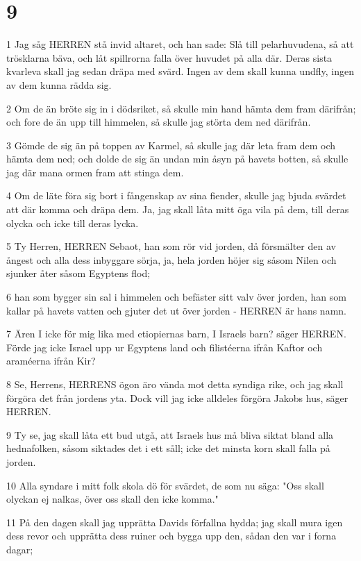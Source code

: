\chapter{9}

\par 1 Jag såg HERREN stå invid altaret, och han sade: Slå till pelarhuvudena, så att trösklarna bäva, och låt spillrorna falla över huvudet på alla där. Deras sista kvarleva skall jag sedan dräpa med svärd. Ingen av dem skall kunna undfly, ingen av dem kunna rädda sig.
\par 2 Om de än bröte sig in i dödsriket, så skulle min hand hämta dem fram därifrån; och fore de än upp till himmelen, så skulle jag störta dem ned därifrån.
\par 3 Gömde de sig än på toppen av Karmel, så skulle jag där leta fram dem och hämta dem ned; och dolde de sig än undan min åsyn på havets botten, så skulle jag där mana ormen fram att stinga dem.
\par 4 Om de läte föra sig bort i fångenskap av sina fiender, skulle jag bjuda svärdet att där komma och dräpa dem. Ja, jag skall låta mitt öga vila på dem, till deras olycka och icke till deras lycka.
\par 5 Ty Herren, HERREN Sebaot, han som rör vid jorden, då försmälter den av ångest och alla dess inbyggare sörja, ja, hela jorden höjer sig såsom Nilen och sjunker åter såsom Egyptens flod;
\par 6 han som bygger sin sal i himmelen och befäster sitt valv över jorden, han som kallar på havets vatten och gjuter det ut över jorden - HERREN är hans namn.
\par 7 Ären I icke för mig lika med etiopiernas barn, I Israels barn? säger HERREN. Förde jag icke Israel upp ur Egyptens land och filistéerna ifrån Kaftor och araméerna ifrån Kir?
\par 8 Se, Herrens, HERRENS ögon äro vända mot detta syndiga rike, och jag skall förgöra det från jordens yta. Dock vill jag icke alldeles förgöra Jakobs hus, säger HERREN.
\par 9 Ty se, jag skall låta ett bud utgå, att Israels hus må bliva siktat bland alla hednafolken, såsom siktades det i ett såll; icke det minsta korn skall falla på jorden.
\par 10 Alla syndare i mitt folk skola dö för svärdet, de som nu säga: "Oss skall olyckan ej nalkas, över oss skall den icke komma."
\par 11 På den dagen skall jag upprätta Davids förfallna hydda; jag skall mura igen dess revor och upprätta dess ruiner och bygga upp den, sådan den var i forna dagar;
